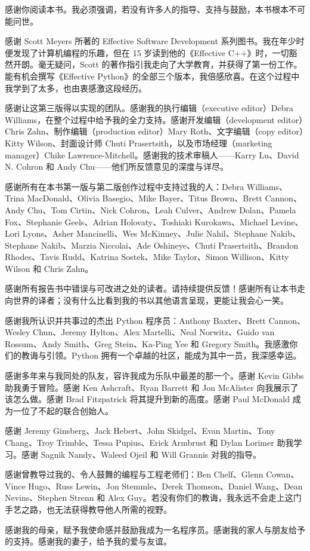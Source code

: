 感谢你阅读本书。我必须强调，若没有许多人的指导、支持与鼓励，本书根本不可能问世。

感谢 Scott Meyers 所著的 Effective Software Development 系列图书。我在年少时便发现了计算机编程的乐趣，但在 15 岁读到他的《Effective C++》时，一切豁然开朗。毫无疑问，Scott 的著作指引我走向了大学教育，并获得了第一份工作。能有机会撰写《Effective Python》的全部三个版本，我倍感欣喜。在这个过程中我学到了太多，也由衷感激这段经历。

感谢让这第三版得以实现的团队。感谢我的执行编辑（executive editor）Debra Williams，在整个过程中给予我的全力支持。感谢开发编辑（development editor）Chris Zahn、制作编辑（production editor）Mary Roth、文字编辑（copy editor）Kitty Wilson、封面设计师 Chuti Prasertsith，以及市场经理（marketing manager）Chike Lawrence-Mitchell。感谢我的技术审稿人——Karry Lu、David N. Cohron 和 Andy Chu——他们所反馈意见的深度与详尽。

感谢所有在本书第一版与第二版创作过程中支持过我的人：Debra Williams、Trina MacDonald、Olivia Basegio、Mike Bayer、Titus Brown、Brett Cannon、Andy Chu、Tom Cirtin、Nick Cohron、Leah Culver、Andrew Dolan、Pamela Fox、Stephanie Geels、Adrian Holovaty、Toshiaki Kurokawa、Michael Levine、Lori Lyons、Asher Mancinelli、Wes McKinney、Julie Nahil、Stephane Nakib、Stephane Nakib、Marzia Niccolai、Ade Oshineye、Chuti Prasertsith、Brandon Rhodes、Tavis Rudd、Katrina Sostek、Mike Taylor、Simon Willison、Kitty Wilson 和 Chris Zahn。

感谢所有报告书中错误与可改进之处的读者。请持续提供反馈！感谢所有让本书走向世界的译者；没有什么比看到我的书以其他语言呈现，更能让我会心一笑。

感谢我所认识并共事过的杰出 Python 程序员：Anthony Baxter、Brett Cannon、Wesley Chun、Jeremy Hylton、Alex Martelli、Neal Norwitz、Guido van Rossum、Andy Smith、Greg Stein、Ka-Ping Yee 和 Gregory Smith。我感激你们的教诲与引领。Python 拥有一个卓越的社区，能成为其中一员，我深感幸运。

感谢多年来与我同处的队友，容许我成为乐队中最差的那一个。感谢 Kevin Gibbs 助我勇于冒险。感谢 Ken Ashcraft、Ryan Barrett 和 Jon McAlister 向我展示了该怎么做。感谢 Brad Fitzpatrick 将其提升到新的高度。感谢 Paul McDonald 成为一位了不起的联合创始人。

感谢 Jeremy Ginsberg、Jack Hebert、John Skidgel、Evan Martin、Tony Chang、Troy Trimble、Tessa Pupius、Erick Armbrust 和 Dylan Lorimer 助我学习。感谢 Sagnik Nandy、Waleed Ojeil 和 Will Grannis 对我的指导。

感谢曾教导过我的、令人鼓舞的编程与工程老师们：Ben Chelf、Glenn Cowan、Vince Hugo、Russ Lewin、Jon Stemmle、Derek Thomson、Daniel Wang、Dean Nevins、Stephen Strenn 和 Alex Guy。若没有你们的教诲，我永远不会走上这门手艺之路，也无法获得教导他人所需的视野。

感谢我的母亲，赋予我使命感并鼓励我成为一名程序员。感谢我的家人与朋友给予的支持。感谢我的妻子，给予我的爱与友谊。
